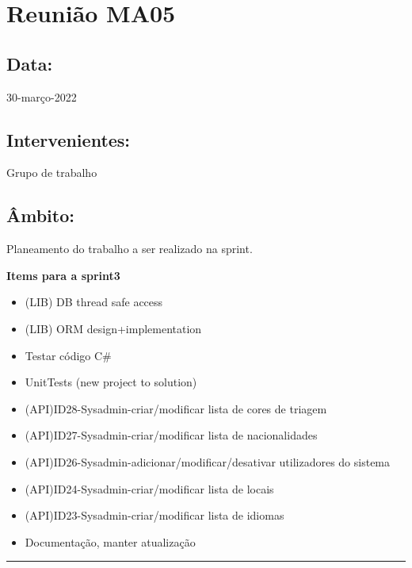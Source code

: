 \section{Reunião MA05}\label{reuniaoMA05}

\subsection*{Data:}
30-março-2022

\subsection*{Intervenientes:}
Grupo de trabalho

\subsection*{Âmbito:}
Planeamento do trabalho a ser realizado na sprint.

\textbf{Items para a sprint3}

\begin{itemize}
	\item (LIB) DB thread safe access
	\item (LIB) ORM design+implementation
	\item Testar código C\#
	\item UnitTests (new project to solution)
	\item (API)ID28-Sysadmin-criar/modificar lista de cores de triagem
	\item (API)ID27-Sysadmin-criar/modificar lista de nacionalidades
	\item (API)ID26-Sysadmin-adicionar/modificar/desativar utilizadores do sistema
	\item (API)ID24-Sysadmin-criar/modificar lista de locais
	\item (API)ID23-Sysadmin-criar/modificar lista de idiomas
	\item Documentação, manter atualização
\end{itemize}

\noindent \rule{\linewidth}{0.4pt}
\newline
